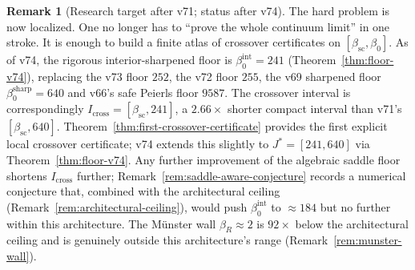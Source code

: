 \documentclass[11pt]{article}
\theoremstyle{definition}
\newtheorem{remark}[theorem]{Remark}
\newcommand{\betasc}{\beta_{\mathrm{sc}}}
\begin{document}
\begin{remark}[Research target after v71; status after v74]
\label{rem:v71-target}
The hard problem is now localized.  One no longer has to ``prove the
whole continuum limit'' in one stroke.  It is enough to build a finite
atlas of crossover certificates on $[\betasc,\beta_0]$.  As of v74,
the rigorous interior-sharpened floor is $\beta_0^{\mathrm{int}}=241$
\textup{(}Theorem~\ref{thm:floor-v74}\textup{)}, replacing the
v73 floor $252$, the v72 floor $255$, the v69 sharpened floor
$\beta_0^{\mathrm{sharp}}=640$ and v66's safe Peierls floor $9587$.
The crossover interval is correspondingly
$I_{\mathrm{cross}}=[\betasc,241]$, a $2.66\times$ shorter compact
interval than v71's $[\betasc,640]$.
Theorem~\ref{thm:first-crossover-certificate} provides the first
explicit local crossover certificate; v74 extends this slightly to
$J^*=[241,640]$ via Theorem~\ref{thm:floor-v74}.  Any further
improvement of the algebraic saddle floor shortens
$I_{\mathrm{cross}}$ further; Remark~\ref{rem:saddle-aware-conjecture}
records a numerical conjecture that, combined with the architectural
ceiling \textup{(}Remark~\ref{rem:architectural-ceiling}\textup{)},
would push $\beta_0^{\mathrm{int}}$ to $\approx 184$ but no further
within this architecture.  The M\"unster wall $\beta_R\approx 2$ is
$92\times$ below the architectural ceiling and is genuinely outside
this architecture's range \textup{(}Remark~\ref{rem:munster-wall}\textup{)}.
\end{remark}
\end{document}
